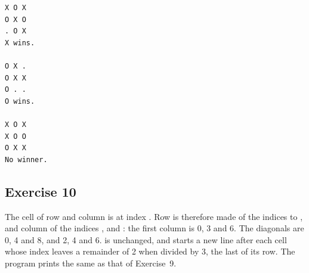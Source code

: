 
\vspace{-10pt}%
\begin{lstlisting}[style=bashVerb]
X O X
O X O
. O X
X wins.

O X .
O X X
O . .
O wins.

X O X
X O O
O X X
No winner.
\end{lstlisting}

\subsection*{Exercise 10}

The cell of row  and column  is at index .
Row  is therefore made of the indices  to
, and column  of the indices , 
and : the first column is 0, 3 and 6. The diagonals are 0, 4 and 8,
and 2, 4 and 6.  is unchanged, and  starts a new line
after each cell whose index leaves a remainder of 2 when divided by 3, the last
of its row. The program prints the same as that of Exercise~9.


